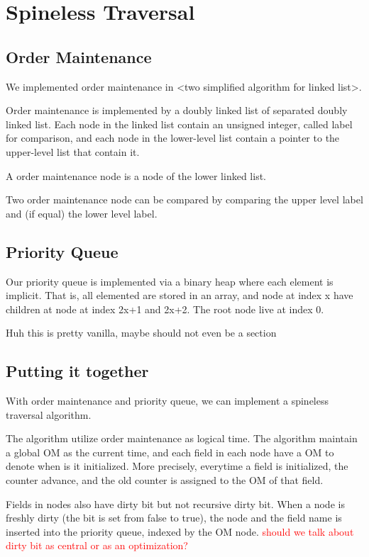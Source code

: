 \documentclass[format=acmsmall, review=false, screen=true]{acmart}
\newcommand\todo[1]{\textcolor{red}{#1}}
\begin{document}
\section{Spineless Traversal}
\subsection{Order Maintenance}
We implemented order maintenance in <two simplified algorithm for linked list>.

Order maintenance is implemented by a doubly linked list of separated doubly linked list. Each node in the linked list contain an unsigned integer, called label for comparison, and each node in the lower-level list contain a pointer to the upper-level list that contain it.

A order maintenance node is a node of the lower linked list.

Two order maintenance node can be compared by comparing the upper level label and (if equal) the lower level label.

\subsection{Priority Queue}
Our priority queue is implemented via a binary heap where each element is implicit. That is, all elemented are stored in an array, and node at index x have children at node at index 2x+1 and 2x+2. The root node live at index 0.

Huh this is pretty vanilla, maybe should not even be a section
\subsection{Putting it together}
With order maintenance and priority queue, we can implement a spineless traversal algorithm.

The algorithm utilize order maintenance as logical time. The algorithm maintain a global OM as the current time, and each field in each node have a OM to denote when is it initialized. More precisely, everytime a field is initialized, the counter advance, and the old counter is assigned to the OM of that field.

Fields in nodes also have dirty bit but not recursive dirty bit. When a node is freshly dirty (the bit is set from false to true), the node and the field name is inserted into the priority queue, indexed by the OM node. \todo{should we talk about dirty bit as central or as an optimization?}
\end{document}
